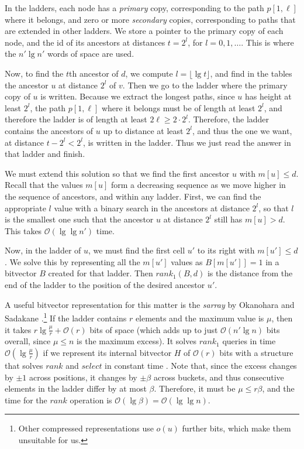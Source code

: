 \documentclass[11pt]{article}
\renewcommand{\log}{\lg}
\newcommand{\0}{\mathit{0}}
\newcommand{\1}{\mathit{1}}
\newcommand{\rank}{\mathit{rank}}
\newcommand{\select}{\mathit{select}}
\newcommand{\Oh}[1]{\mathcal{O}\!\left(#1\right)}
\begin{document}
In the ladders,
each node has a {\em primary} copy, corresponding to the path $p[1,\ell]$ where
it belongs, and zero or more {\em secondary} copies, corresponding to paths
that are extended in other ladders. We store a pointer to the primary copy of
each node, and the id of its ancestors at distances $t=2^l$, for $l=0,1,\ldots$.
This is where the $n'\log n'$ words of space are used.

Now, to find the $t$th ancestor of $d$, we compute $l=\lfloor \log t \rfloor$,
and find in the tables the ancestor $u$ at distance $2^l$ of $v$. Then we go
to the ladder where the primary copy of $u$ is written. Because we
extract the longest paths, since $u$ has height at least $2^l$, the path
$p[1,\ell]$ where it belongs must be of length at least $2^l$, and therefore
the ladder is of length at least $2\ell \ge 2\cdot 2^l$. Therefore, the ladder
contains the ancestors of $u$ up to distance at least $2^l$, and thus the one
we want, at distance $t-2^l < 2^l$, is written in the ladder. Thus we just read
the answer in that ladder and finish.

We must extend this solution so that we find the first ancestor $u$ with 
$m[u] \le d$. Recall that the values $m[u]$ form a decreasing sequence as we
move higher in the sequence of ancestors, and within any ladder. First, we
can find the appropriate $l$ value with a binary search in the ancestors at
distance $2^l$, so that $l$ is the smallest one such that the ancestor $u$
at distance $2^l$ still has $m[u] > d$. This takes $\Oh{\log\log n'}$ time.

Now, in the ladder of $u$, we must find the first cell $u'$ to its
right with $m[u'] \le d$. We solve this by representing all the $m[u']$ values
as $B[m[u']]=1$ in a bitvector $B$ created for that ladder. Then 
$\rank_1(B,d)$ is the distance from the end of the ladder to the position of
the desired ancestor $u'$.

A useful bitvector representation for this matter is the \emph{sarray} by
Okanohara and Sadakane \cite[Sec.~6]{OS07}.\footnote{Other compressed
representations use $o(u)$ further bits, which make them unsuitable for us.}
If the ladder contains $r$
elements and the maximum value is $\mu$, then it takes $r\log\frac{\mu}{r} +
\Oh{r}$ bits of space (which adds up to just $\Oh{n'\log n}$ bits overall, since
$\mu \le n$ is the maximum excess). It solves $\rank_1$ queries in time
$\Oh{\log\frac{\mu}{r}}$ if we represent its internal bitvector $H$ of $\Oh{r}$
bits with a structure that solves $\rank$ and $\select$ in constant time
\cite{Cla96}. Note that, since the excess changes by $\pm 1$ across positions,
it changes by $\pm \beta$ across buckets, and thus consecutive elements in the
ladder differ by at most $\beta$. Therefore, it must be $\mu \le r\beta$, and
the time for the $\rank$ operation is $\Oh{\log\beta}=\Oh{\log\log n}$.
\end{document}
